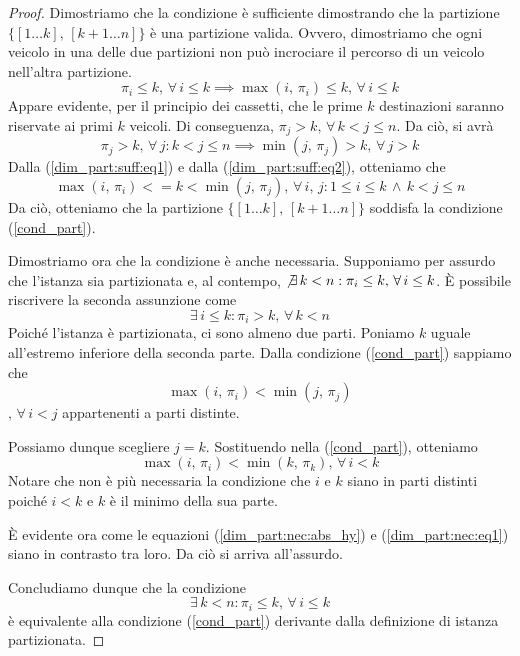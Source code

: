 \documentclass{article}
\begin{document}
\begin{proof}
    Dimostriamo che la condizione è sufficiente dimostrando che la partizione $\{[1\dots k],\, [k+1\dots n]\}$ è una partizione valida.
    Ovvero, dimostriamo che ogni veicolo in una delle due partizioni non può incrociare il percorso di un veicolo nell'altra partizione.
    \begin{equation}
        \label{dim_part:suff:eq1}
        \pi_i \leq k,\, \forall\, i \leq k \implies \max(i,\, \pi_i) \leq k,\, \forall\, i \leq k
    \end{equation}
    Appare evidente, per il principio dei cassetti, che le prime $k$ destinazioni saranno riservate ai primi $k$ veicoli.
    Di conseguenza,
    $\pi_j > k,\, \forall\, k < j \leq n$.
    Da ciò, si avrà
    \begin{equation}
        \label{dim_part:suff:eq2}
        \pi_j > k,\, \forall\, j :  k < j \leq n \implies \min(j,\, \pi_j) > k,\, \forall\, j > k
    \end{equation}
    Dalla (\ref{dim_part:suff:eq1}) e dalla (\ref{dim_part:suff:eq2}), otteniamo che
    \[ \max(i,\, \pi_i) <= k < \min(j,\, \pi_j),\, \forall\, i,\, j : 1 \leq i \leq k\,  \wedge\, k < j \leq n \]
    Da ciò, otteniamo che la partizione $\{[1\dots k],\, [k+1\dots n]\}$ soddisfa la condizione (\ref{cond_part}).

    Dimostriamo ora che la condizione è anche necessaria.
    Supponiamo per assurdo che l'istanza sia partizionata e, al contempo,
    $\not\exists\, k < n : \pi_i \leq k,\, \forall\, i \leq k$.
    È possibile riscrivere la seconda assunzione come
    \begin{equation}
        \label{dim_part:nec:abs_hy}
        \exists\, i \leq k : \pi_i > k,\, \forall\, k < n
    \end{equation}
    Poiché l'istanza è partizionata, ci sono almeno due parti.
    Poniamo $k$ uguale all'estremo inferiore della seconda parte.
    Dalla condizione (\ref{cond_part}) sappiamo che
    \[ \max(i,\, \pi_i) < \min(j,\, \pi_j) \]
    $,\, \forall\, i < j$ appartenenti a parti distinte.

    Possiamo dunque scegliere $j = k$.
    Sostituendo nella (\ref{cond_part}), otteniamo
    \begin{equation}
        \label{dim_part:nec:eq1}
        \max(i,\, \pi_i) < \min(k,\, \pi_k),\, \forall\, i < k
    \end{equation}
    Notare che non è più necessaria la condizione che $i$ e $k$ siano in parti distinti poiché $i < k$ e $k$ è il minimo della sua parte.

    È evidente ora come le equazioni (\ref{dim_part:nec:abs_hy}) e (\ref{dim_part:nec:eq1}) siano in contrasto tra loro.
    Da ciò si arriva all'assurdo.

    Concludiamo dunque che la condizione
    \begin{equation}\label{dim_part:cond_sempl}
        \exists\, k < n : \pi_i \leq k,\, \forall\, i \leq k
    \end{equation}
    è equivalente alla condizione (\ref{cond_part}) derivante dalla definizione di istanza partizionata.

\end{proof}
\end{document}
